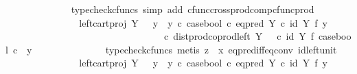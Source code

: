 \begin{isabellebody}
\ \ \ \ \ \ \ \ \ \ \ \ \isamarkupfalse%
\ {\isacharparenleft}{\kern0pt}typecheck{\isacharunderscore}{\kern0pt}cfuncs{\isacharcomma}{\kern0pt}\ simp\ add{\isacharcolon}{\kern0pt}\ cfunc{\isacharunderscore}{\kern0pt}cross{\isacharunderscore}{\kern0pt}prod{\isacharunderscore}{\kern0pt}comp{\isacharunderscore}{\kern0pt}cfunc{\isacharunderscore}{\kern0pt}prod{\isacharparenright}{\kern0pt}\isanewline
\ \ \ \ \ \ \ \ \ \ \isamarkupfalse%
\ \isamarkupfalse%
\ {\isachardoublequoteopen}{\isachardot}{\kern0pt}{\isachardot}{\kern0pt}{\isachardot}{\kern0pt}\ {\isacharequal}{\kern0pt}\ {\isacharparenleft}{\kern0pt}left{\isacharunderscore}{\kern0pt}cart{\isacharunderscore}{\kern0pt}proj\ Y\ {\isasymone}\ {\isasymamalg}\ {\isacharparenleft}{\kern0pt}{\isacharparenleft}{\kern0pt}y{}\ {\isasymamalg}\ y{}{\isacharparenright}{\kern0pt}\ {\isasymcirc}\isactrlsub c\ case{\isacharunderscore}{\kern0pt}bool\ {\isasymcirc}\isactrlsub c\ eq{\isacharunderscore}{\kern0pt}pred\ Y\ {\isasymcirc}\isactrlsub c\ {\isacharparenleft}{\kern0pt}id\ Y\ {\isasymtimes}\isactrlsub f\ y{}{\isacharparenright}{\kern0pt}{\isacharparenright}{\kern0pt}{\isacharparenright}{\kern0pt}\ \isanewline
\ \ \ \ \ \ \ \ \ \ \ \ \ \ \ \ \ \ \ \ \ \ \ \ \ \ \ \ \ \ \ \ \ {\isasymcirc}\isactrlsub c\ dist{\isacharunderscore}{\kern0pt}prod{\isacharunderscore}{\kern0pt}coprod{\isacharunderscore}{\kern0pt}left\ Y\ {\isasymone}\ {\isasymone}\ {\isasymcirc}\isactrlsub c\ {\isacharparenleft}{\kern0pt}id\ Y\ {\isasymtimes}\isactrlsub f\ case{\isacharunderscore}{\kern0pt}bool{\isacharparenright}{\kern0pt}\ {\isasymcirc}\isactrlsub c\ \ {\isasymlangle}y{\isacharcomma}{\kern0pt}\ {\isasymf}{\isasymrangle}{\isachardoublequoteclose}\isanewline
\ \ \ \ \ \ \ \ \ \ \ \ \isamarkupfalse%
\ {\isacharparenleft}{\kern0pt}typecheck{\isacharunderscore}{\kern0pt}cfuncs{\isacharcomma}{\kern0pt}\ metis\ {\isacartoucheopen}z\ {\isasymnoteq}\ x{\isacartoucheclose}\ eq{\isacharunderscore}{\kern0pt}pred{\isacharunderscore}{\kern0pt}iff{\isacharunderscore}{\kern0pt}eq{\isacharunderscore}{\kern0pt}conv\ id{\isacharunderscore}{\kern0pt}left{\isacharunderscore}{\kern0pt}unit{}{\isacharparenright}{\kern0pt}\isanewline
\ \ \ \ \ \ \ \ \ \ \isamarkupfalse%
\ \isamarkupfalse%
\ {\isachardoublequoteopen}{\isachardot}{\kern0pt}{\isachardot}{\kern0pt}{\isachardot}{\kern0pt}\ {\isacharequal}{\kern0pt}\ {\isacharparenleft}{\kern0pt}left{\isacharunderscore}{\kern0pt}cart{\isacharunderscore}{\kern0pt}proj\ Y\ {\isasymone}\ {\isasymamalg}\ {\isacharparenleft}{\kern0pt}{\isacharparenleft}{\kern0pt}y{}\ {\isasymamalg}\ y{}{\isacharparenright}{\kern0pt}\ {\isasymcirc}\isactrlsub c\ case{\isacharunderscore}{\kern0pt}bool\ {\isasymcirc}\isactrlsub c\ eq{\isacharunderscore}{\kern0pt}pred\ Y\ {\isasymcirc}\isactrlsub c\ {\isacharparenleft}{\kern0pt}id\ Y\ {\isasymtimes}\isactrlsub f\ y{}{\isacharparenright}{\kern0pt}{\isacharparenright}{\kern0pt}{\isacharparenright}{\kern0pt}\ \isanewline

\end{isabellebody}
